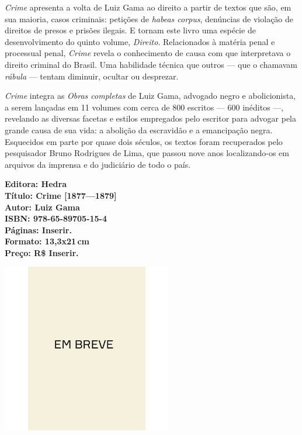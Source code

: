 \noindent{}\textit{Crime} apresenta a volta de Luiz Gama ao direito a partir de textos que são, em sua maioria, casos criminais: petições de \textit{habeas corpus}, denúncias de violação de direitos de presos e prisões ilegais. E tornam este livro uma espécie de desenvolvimento do quinto volume, \textit{Direito}. Relacionados à matéria penal e processual penal, \textit{Crime} revela o conhecimento de causa com que interpretava o direito criminal do Brasil. Uma habilidade técnica que outros --- que o chamavam \textit{rábula} --- tentam diminuir, ocultar ou desprezar.

\textit{Crime} integra as \textit{Obras completas} de Luiz Gama, advogado negro e abolicionista, a serem lançadas em 11 volumes com cerca de 800 escritos --- 600 inéditos ---, revelando as diversas facetas e estilos empregados pelo escritor para advogar pela grande causa de sua vida: a abolição da escravidão e a emancipação negra. Esquecidos em parte por quase dois séculos, os textos foram recuperados pelo pesquisador Bruno Rodrigues de Lima, que passou nove anos localizando-os em arquivos da imprensa e do judiciário de todo o país.

\vfill
\noindent\begin{minipage}[c]{1\linewidth}
{\small\textbf{
\hspace*{-.1cm}Editora: Hedra\\
Título: Crime [1877—1879]\\
Autor: Luiz Gama\\ 
ISBN: 978-65-89705-15-4\\
Páginas: Inserir.\\
Formato: 13,3x21\,cm\\
Preço: R\$ Inserir.\\
}}
\end{minipage}
\pagebreak

\begin{center}
\hspace*{.5cm}\includegraphics[width=74mm]{./CAPAS/breve.jpeg}
\end{center}
\hspace*{-7cm}\hrulefill\hspace*{-7cm}
\medskip

